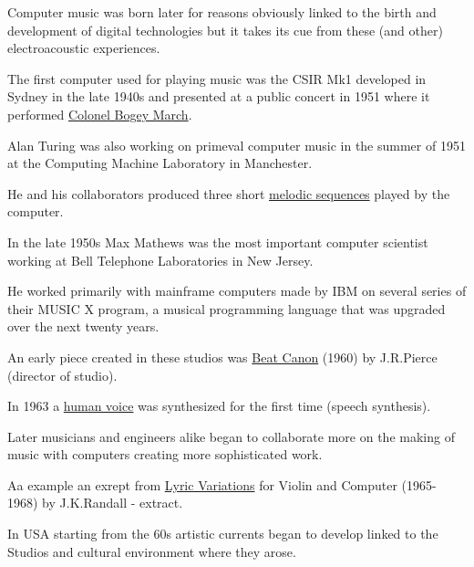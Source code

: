 Computer music was born later for reasons obviously linked to the birth and development of digital technologies but it takes its cue from these (and other) electroacoustic experiences.

The first computer used for playing music was the CSIR Mk1 developed in Sydney in the late 1940s and presented at a public concert in 1951 where
it performed \href{http://www.musicaecodice.it/gitmedia/emc/4_media/colonel.mp3}{Colonel Bogey March}.

Alan Turing was also working on primeval computer music in the summer of 1951 at the Computing Machine Laboratory in Manchester.

He and his collaborators produced three short \href{http://www.musicaecodice.it/gitmedia/emc/4_media/godsave.mp3}{melodic sequences} played by the computer.

In the late 1950s Max Mathews was the most important computer scientist working at Bell Telephone Laboratories in New Jersey.

He worked primarily with mainframe computers made by IBM on several series of their MUSIC X program, a musical programming language that was upgraded over the next twenty years.

An early piece created in these studios was \href{http://www.musicaecodice.it/gitmedia/emc/4_media/canon.mp3}{Beat Canon} (1960) by J.R.Pierce (director of studio).

In 1963 a \href{http://www.musicaecodice.it/gitmedia/emc/4_media/speech.mp3}{human voice} was synthesized for the first time (speech synthesis).

Later musicians and engineers alike began to collaborate more on the making of music with computers creating more sophisticated work.

Aa example an exrept from \href{http://www.musicaecodice.it/gitmedia/emc/4_media/violin.mp3}{Lyric Variations} for Violin and Computer (1965-1968) by J.K.Randall - extract.

In USA starting from the 60s artistic currents began to develop linked to the Studios and cultural environment where they arose.

